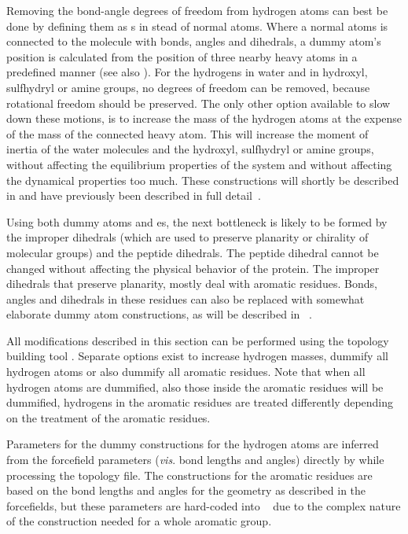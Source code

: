 Removing the bond-angle degrees of freedom from hydrogen atoms can
best be done by defining them as s in stead of
normal atoms. Where a normal atoms is connected to the molecule with
bonds, angles and dihedrals, a dummy atom's position is calculated
from the position of three nearby heavy atoms in a predefined manner
(see also ). For the hydrogens in water and in
hydroxyl, sulfhydryl or amine groups, no degrees of freedom can be
removed, because rotational freedom should be preserved. The only
other option available to slow down these motions, is to increase the
mass of the hydrogen atoms at the expense of the mass of the connected
heavy atom. This will increase the moment of inertia of the water
molecules and the hydroxyl, sulfhydryl or amine groups, without
affecting the equilibrium properties of the system and without
affecting the dynamical properties too much. These constructions will
shortly be described in  and have previously
been described in full detail~\cite{feenstra99}.

Using both dummy atoms and es, the next
bottleneck is likely to be formed by the improper dihedrals (which are
used to preserve planarity or chirality of molecular groups) and the
peptide dihedrals. The peptide dihedral cannot be changed without
affecting the physical behavior of the protein. The improper dihedrals
that preserve planarity, mostly deal with aromatic residues. Bonds,
angles and dihedrals in these residues can also be replaced with
somewhat elaborate dummy atom constructions, as will be described in
~\cite{feenstra01}.

All modifications described in this section can be performed using the
{\gromacs} topology building tool {\tt {}}. Separate
options exist to increase hydrogen masses, dummify all hydrogen atoms
or also dummify all aromatic residues. Note that when all hydrogen
atoms are dummified, also those inside the aromatic residues will be
dummified, {\ie} hydrogens in the aromatic residues are treated
differently depending on the treatment of the aromatic residues.

Parameters for the dummy constructions for the hydrogen atoms are
inferred from the forcefield parameters ({\em vis}. bond lengths and
angles) directly by {\tt {}} while processing the
topology file.  The constructions for the aromatic residues are based
on the bond lengths and angles for the geometry as described in the
forcefields, but these parameters are hard-coded into {\tt
{}} due to the complex nature of the construction
needed for a whole aromatic group.


